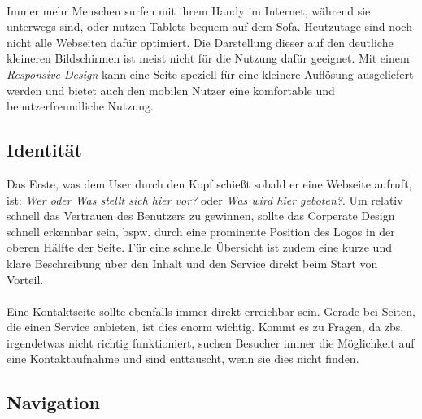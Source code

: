 \\
Immer mehr Menschen surfen mit ihrem Handy im Internet, während sie unterwegs sind, oder nutzen Tablets bequem auf dem Sofa. Heutzutage sind noch nicht alle Webseiten dafür optimiert. Die Darstellung dieser auf den deutliche kleineren Bildschirmen ist meist nicht für die Nutzung dafür geeignet. Mit einem \textit{Responsive Design} kann eine Seite speziell für eine kleinere Auflösung ausgeliefert werden und bietet auch den mobilen Nutzer eine komfortable und benutzerfreundliche Nutzung.


\subsection{Identität}

Das Erste, was dem User durch den Kopf schießt sobald er eine Webseite aufruft, ist: \textit{\glqq Wer oder Was stellt sich hier vor?\grqq{}} oder \textit{\glqq Was wird hier geboten?\grqq{}}. Um relativ schnell das Vertrauen des Benutzers zu gewinnen, sollte das Corperate Design schnell erkennbar sein, bspw. durch eine prominente Position des Logos in der oberen Hälfte der Seite. Für eine schnelle Übersicht ist zudem eine kurze und klare Beschreibung über den Inhalt und den Service direkt beim Start von Vorteil.\\
\\
Eine Kontaktseite sollte ebenfalls immer direkt erreichbar sein. Gerade bei Seiten, die einen Service anbieten, ist dies enorm wichtig. Kommt es zu Fragen, da zbs. irgendetwas nicht richtig funktioniert, suchen Besucher immer die Möglichkeit auf eine Kontaktaufnahme und sind enttäuscht, wenn sie dies nicht finden.


\subsection{Navigation}

